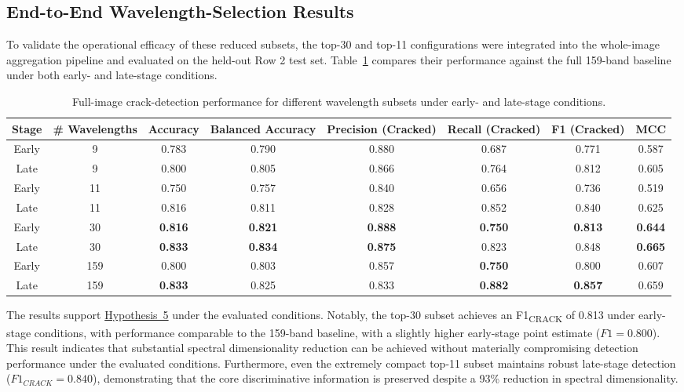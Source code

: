 \begin{landscape}

\subsection{End-to-End Wavelength-Selection Results}

\noindent
To validate the operational efficacy of these reduced subsets, the top-30 and top-11 configurations were integrated into the whole-image aggregation pipeline and evaluated on the held-out Row 2 test set. Table~\ref{tab:full_image_wavelength_results} compares their performance against the full 159-band baseline under both early- and late-stage conditions.

\begin{table}[!htbp]
\centering
\caption[Full-image performance across wavelength subsets]{Full-image crack-detection performance for different wavelength subsets under early- and late-stage conditions.}
\label{tab:full_image_wavelength_results}
\begin{tabular}{cccccccc}
\toprule
Stage & \# Wavelengths & Accuracy & Balanced Accuracy & Precision (Cracked) & Recall (Cracked) & F1 (Cracked) & MCC \\
\midrule
Early & 9 & 0.783 & 0.790 & 0.880 & 0.687 & 0.771 & 0.587  \\
Late  & 9 & 0.800 & 0.805 & 0.866 & 0.764 & 0.812 & 0.605  \\
\midrule
Early & 11 & 0.750 & 0.757 & 0.840 & 0.656 & 0.736 & 0.519  \\
Late  & 11 & 0.816 & 0.811 & 0.828 & 0.852 & 0.840 & 0.625  \\
\midrule
Early & 30 & \textbf{0.816} & \textbf{0.821} & \textbf{0.888} & \textbf{0.750} & \textbf{0.813} & \textbf{0.644}  \\
Late  & 30 & \textbf{0.833} & \textbf{0.834} & \textbf{0.875} & 0.823 & 0.848 & \textbf{0.665}  \\
\midrule
Early & 159 & 0.800 & 0.803 & 0.857 & \textbf{0.750} & 0.800 & 0.607  \\
Late  & 159 & \textbf{0.833} & 0.825 & 0.833 & \textbf{0.882} & \textbf{0.857} & 0.659  \\
\bottomrule
\end{tabular}
\end{table}

\FloatBarrier

\noindent
The results support \hyperref[hyp:spectral_efficiency]{Hypothesis~5} under the evaluated conditions. Notably, the top-30 subset achieves an F1\textsubscript{CRACK} of 0.813 under early-stage conditions, with performance comparable to the 159-band baseline, with a slightly higher early-stage point estimate ($F1{=}0.800$). This result indicates that substantial spectral dimensionality reduction can be achieved without materially compromising detection performance under the evaluated conditions. Furthermore, even the extremely compact top-11 subset maintains robust late-stage detection ($F1_{CRACK} = 0.840$), demonstrating that the core discriminative information is preserved despite a 93\% reduction in spectral dimensionality.

\end{landscape}

